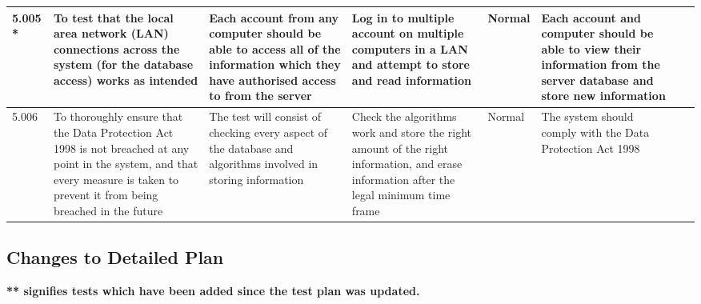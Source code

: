 \begin{landscape}
\begin{center}
\begin{longtable}{|p{1.5cm}|p{2.5cm}|p{2.5cm}|p{2cm}|p{2cm}|p{2cm}|p{2cm}|p{2cm}|}
5.005 * & To test that the local area network (LAN) connections across the system (for the database access) works as intended & Each account from any computer should be able to access all of the information which they have authorised access to from the server & Log in to multiple account on multiple computers in a LAN and attempt to store and read information & Normal & Each account and computer should be able to view their information from the server database and store new information & & \\ \hline
5.006 & To thoroughly ensure that the Data Protection Act 1998 is not breached at any point in the system, and that every measure is taken to prevent it from being breached in the future & The test will consist of checking every aspect of the database and algorithms involved in storing information & Check the algorithms work and store the right amount of the right information, and erase information after the legal minimum time frame & Normal & The system should comply with the Data Protection Act 1998 & & \\ \hline
    \end{longtable}
\end{center}

\subsection{Changes to Detailed Plan}

\textbf{** signifies tests which have been added since the test plan was updated.}


\end{landscape}
